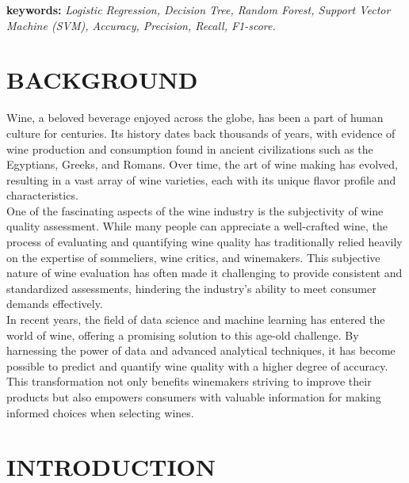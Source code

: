 \documentclass{report}
\begin{document}
\vspace*{0.5cm}

\textbf{keywords:} \textit{Logistic Regression, Decision Tree, Random Forest, Support Vector Machine (SVM), Accuracy, Precision, Recall, F1-score.}


\chapter*{\huge{BACKGROUND}}
Wine, a beloved beverage enjoyed across the globe, has been a part of human culture for centuries. Its history dates back thousands of years, with evidence of wine production and consumption found in ancient civilizations such as the Egyptians, Greeks, and Romans. Over time, the art of wine making has evolved, resulting in a vast array of wine varieties, each with its unique flavor profile and characteristics.
\vspace*{0.5cm}\\One of the fascinating aspects of the wine industry is the subjectivity of wine quality assessment. While many people can appreciate a well-crafted wine, the process of evaluating and quantifying wine quality has traditionally relied heavily on the expertise of sommeliers, wine critics, and winemakers. This subjective nature of wine evaluation has often made it challenging to provide consistent and standardized assessments, hindering the industry's ability to meet consumer demands effectively.
\vspace*{0.5cm}\\In recent years, the field of data science and machine learning has entered the world of wine, offering a promising solution to this age-old challenge. By harnessing the power of data and advanced analytical techniques, it has become possible to predict and quantify wine quality with a higher degree of accuracy. This transformation not only benefits winemakers striving to improve their products but also empowers consumers with valuable information for making informed choices when selecting wines.
\chapter*{\huge{INTRODUCTION}}
\end{document}
